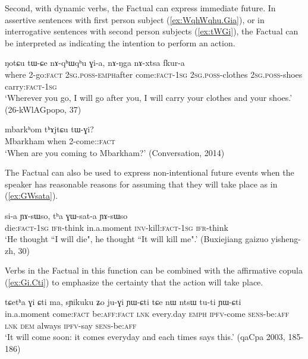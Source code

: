 Second, with dynamic verbs, the Factual can express immediate future. In  assertive sentences with first person subject (\ref{ex:WqhWqhu.Gia}), or in interrogative sentences with second person subjects (\ref{ex:tWGi}), the Factual can be interpreted as indicating the intention to perform an action.

\begin{exe}
\ex \label{ex:WqhWqhu.Gia}
\gll ŋotɕu tɯ-ɕe nɤ-qʰɯ\redp{}qʰu ɣi-a, nɤ-ŋga nɤ-xtsa fkur-a \\
where 2-go:\textsc{fact} \textsc{2sg}.\textsc{poss}-\textsc{emph}\redp{}after come:\textsc{fact}-\textsc{1sg} \textsc{2sg}.\textsc{poss}-clothes  \textsc{2sg}.\textsc{poss}-shoes carry:\textsc{fact}-\textsc{1sg} \\
\glt `Wherever you go, I will go after you, I will carry your clothes and your shoes.' (26-kWlAGpopo, 37)
\end{exe}

\begin{exe}
\ex \label{ex:tWGi}
\gll mbarkʰom tʰɤjtɕu tɯ-ɣi? \\
Mbarkham when 2-come::\textsc{fact} \\
\glt `When are you coming to Mbarkham?' (Conversation, 2014)
\end{exe}

The Factual can also be used to express non-intentional future events when the speaker has reasonable reasons for assuming that they will take place as in (\ref{ex:GWsata}). 

\begin{exe}
\ex \label{ex:GWsata}
\gll si-a ɲɤ-sɯso, tʰa ɣɯ-sat-a ɲɤ-sɯso \\
die:\textsc{fact}-\textsc{1sg} \textsc{ifr}-think in.a.moment \textsc{inv}-kill:\textsc{fact}-\textsc{1sg} \textsc{ifr}-think \\
\glt `He thought ``I will die", he thought ``It will kill me".' (Buxiejiang gaizuo yisheng-zh, 30)
\end{exe}

Verbs in the Factual in this function can be combined with the affirmative copula  (\ref{ex:Gi.Cti}) to emphasize the certainty that the action will take place. 

\begin{exe}
\ex \label{ex:Gi.Cti}
\gll tɕetʰa ɣi ɕti ma, sɲikuku ʑo ju-ɣi ɲɯ-ɕti tɕe nɯ ntsɯ tu-ti ɲɯ-ɕti \\
 in.a.moment come:\textsc{fact} be:\textsc{aff}:\textsc{fact} \textsc{lnk} every.day \textsc{emph} \textsc{ipfv}-come \textsc{sens}-be:\textsc{aff} \textsc{lnk} \textsc{dem} always \textsc{ipfv}-say \textsc{sens}-be:\textsc{aff} \\
\glt `It will come  soon: it comes everyday and each times says this.' (qaCpa 2003, 185-186)
\end{exe}

